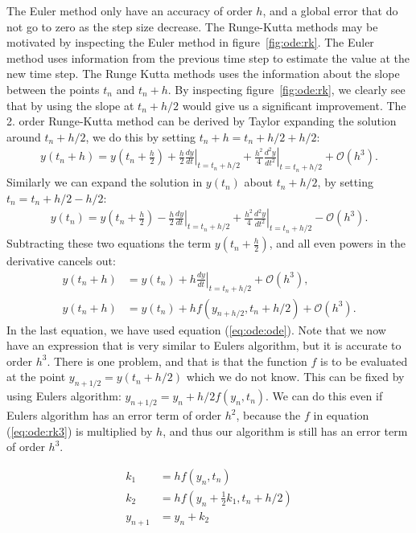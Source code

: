\documentclass[graybox,sectrefs,envcountresetchap,open=right,final]{svmonodo}
\newenvironment{graybox2admon}[1][]{
\begin{graybox2mdframed}[frametitle=#1]
}
{
\end{graybox2mdframed}
}
\begin{document}
The Euler method only have an accuracy of order $h$, and a global error that do not go to zero as the step size decrease. 
The Runge-Kutta methods may be motivated by inspecting the Euler method in figure~\ref{fig:ode:rk}. The Euler method uses information from
the previous time step to estimate the value at the new time step. The Runge Kutta methods uses the information about the slope between the
points $t_n$ and $t_n+h$. By inspecting figure~\ref{fig:ode:rk}, we clearly see that by using the slope at $t_n+h/2$ would give us a
significant improvement. The 2. order Runge-Kutta method can be derived by Taylor expanding the solution around $t_n+h/2$, we do this by
setting $t_n+h=t_n+h/2+h/2$:
\begin{align}
y(t_n+h)=y(t_n+\frac{h}{2})+\frac{h}{2}\left.\frac{dy}{dt}\right|_{t=t_n+h/2}+\frac{h^2}{4}\left.\frac{d^2y}{dt^2}\right|_{t=t_n+h/2}
+\mathcal{O}(h^3).\label{eq:ode:rk1}
\end{align}
Similarly we can expand the solution in $y(t_n)$ about $t_n+h/2$, by setting $t_n=t_n+h/2-h/2$:
\begin{align}
y(t_n)=y(t_n+\frac{h}{2})-\frac{h}{2}\left.\frac{dy}{dt}\right|_{t=t_n+h/2}+\frac{h^2}{4}\left.\frac{d^2y}{dt^2}\right|_{t=t_n+h/2}
-\mathcal{O}(h^3).\label{eq:ode:rk2}
\end{align}
Subtracting these two equations the term $y(t_n+\frac{h}{2})$, and all even powers in the derivative cancels out:
\begin{align}
y(t_n+h)&=y(t_n)+h\left.\frac{dy}{dt}\right|_{t=t_n+h/2}+\mathcal{O}(h^3),\nonumber\\ 
y(t_n+h)&=y(t_n)+hf(y_{n+h/2},t_n+h/2)+\mathcal{O}(h^3).\label{eq:ode:rk3}
\end{align}
In the last equation, we have used equation (\ref{eq:ode:ode}). Note that we now have an expression that is very similar to Eulers algorithm,
but it is accurate to order $h^3$. There is one problem, and that is that the function $f$ is to be evaluated at the point $y_{n+1/2}=y(t_n+h/2)$
which we do not know. This can be fixed by using Eulers algorithm: $y_{n+1/2}=y_n+h/2f(y_n,t_n)$. We can do this even if Eulers algorithm has an error term of order $h^2$, because the $f$ in equation (\ref{eq:ode:rk3}) is multiplied by $h$, and thus our algorithm is still has an error term of order $h^3$. 


\begin{graybox2admon}[The 2. order Runge-Kutta:]
\begin{align}
k_1&=hf(y_n,t_n)\nonumber\\ 
k_2&=hf(y_n+\frac{1}{2}k_1,t_n+h/2)\nonumber\\ 
y_{n+1}&=y_n+k_2\label{eq:ode:rk4}
\end{align}
\end{graybox2admon}
\end{document}
